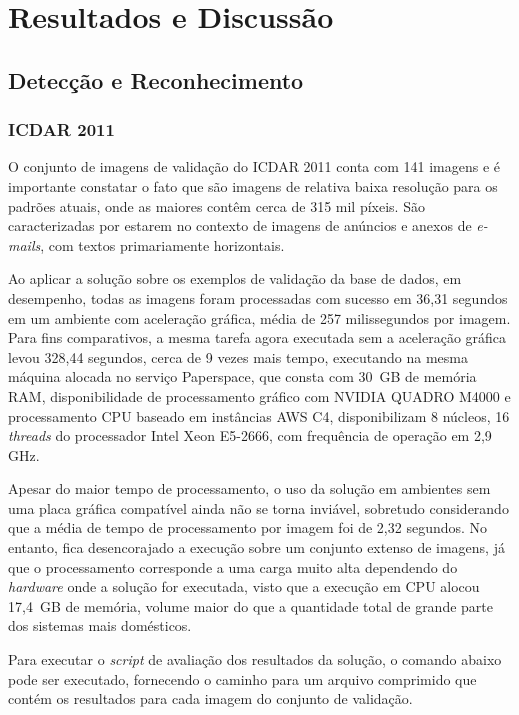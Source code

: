 \chapter{Resultados e Discussão}\label{cap:resultados}

\section{Detecção e Reconhecimento}
\subsection{ICDAR 2011}\label{sec:results_icdar_2011}
O conjunto de imagens de validação do ICDAR 2011 conta com 141 imagens e é importante constatar o fato que são imagens de 
relativa baixa resolução para os padrões atuais, onde as maiores contêm cerca de 315 mil píxeis. São caracterizadas por 
estarem no contexto de imagens de anúncios e anexos de \textit{e-mails}, com textos primariamente horizontais.

Ao aplicar a solução sobre os exemplos de validação da base de dados, em desempenho, todas as imagens foram processadas com 
sucesso em 36,31 segundos em um ambiente com aceleração gráfica, média de 257 milissegundos por imagem. Para fins comparativos, 
a mesma tarefa agora executada sem a aceleração gráfica levou 328,44 segundos, cerca de 9 vezes mais tempo, executando na 
mesma máquina alocada no serviço Paperspace, que consta com 30 GB de memória RAM, disponibilidade de processamento gráfico 
com NVIDIA QUADRO M4000 e processamento CPU baseado em instâncias AWS C4, disponibilizam 8 núcleos, 16 \textit{threads} do 
processador Intel Xeon E5-2666, com frequência de operação em 2,9 GHz.

Apesar do maior tempo de processamento, o uso da solução em ambientes sem uma placa gráfica compatível ainda não se torna 
inviável, sobretudo considerando que a média de tempo de processamento por imagem foi de 2,32 segundos. No entanto, fica 
desencorajado a execução sobre um conjunto extenso de imagens, já que o processamento corresponde a uma carga muito 
alta dependendo do \textit{hardware} onde a solução for executada, visto que a execução em CPU alocou 17,4 GB de memória, 
volume maior do que a quantidade total de grande parte dos sistemas mais domésticos.

Para executar o \textit{script} de avaliação dos resultados da solução, o comando abaixo pode ser executado, fornecendo o 
caminho para um arquivo comprimido que contém os resultados para cada imagem do conjunto de validação.

